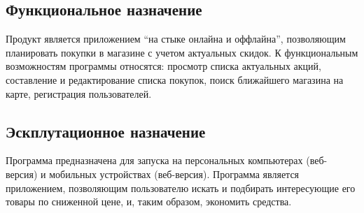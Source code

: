 \subsection{Функциональное назначение}
Продукт является приложением ``на стыке онлайна и оффлайна'', позволяющим планировать
покупки в магазине с учетом актуальных скидок. 
К функциональным возможностям программы относятся:
просмотр списка актуальных акций,
составление и редактирование списка покупок, 
поиск ближайшего магазина на карте,
регистрация пользователей.

\subsection{Эскплутационное назначение}
Программа предназначена для запуска на персональных компьютерах (веб-версия) и 
мобильных устройствах (веб-версия). Программа является 
приложением, позволяющим пользователю искать и подбирать интересующие его товары 
по сниженной цене, и, таким образом, экономить средства. 



